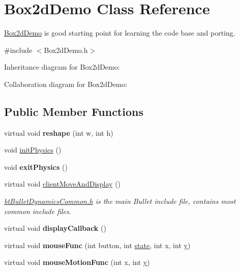 \hypertarget{class_box2d_demo}{\section{Box2d\+Demo Class Reference}
\label{class_box2d_demo}
}


\hyperlink{class_box2d_demo}{Box2d\+Demo} is good starting point for learning the code base and porting.  




{\ttfamily \#include $<$Box2d\+Demo.\+h$>$}



Inheritance diagram for Box2d\+Demo\+:


Collaboration diagram for Box2d\+Demo\+:
\subsection*{Public Member Functions}
\begin{DoxyCompactItemize}
\item 
\hypertarget{class_box2d_demo_afa4baf5e6b4451564c2dc715346d5800}{virtual void {\bfseries reshape} (int w, int h)}\label{class_box2d_demo_afa4baf5e6b4451564c2dc715346d5800}

\item 
void \hyperlink{class_box2d_demo_a424d04d7613f69ee06550fee98341ab8}{init\+Physics} ()
\item 
\hypertarget{class_box2d_demo_a20c44c1313f4e18649c2790307f689d6}{void {\bfseries exit\+Physics} ()}\label{class_box2d_demo_a20c44c1313f4e18649c2790307f689d6}

\item 
virtual void \hyperlink{class_box2d_demo_a138f47a65b5cc193011e4060ba4e6257}{client\+Move\+And\+Display} ()
\begin{DoxyCompactList}\small\item\em \hyperlink{bt_bullet_dynamics_common_8h_source}{bt\+Bullet\+Dynamics\+Common.\+h} is the main Bullet include file, contains most common include files. \end{DoxyCompactList}\item 
\hypertarget{class_box2d_demo_a5de8f1df336c6f63237256979f3a97b4}{virtual void {\bfseries display\+Callback} ()}\label{class_box2d_demo_a5de8f1df336c6f63237256979f3a97b4}

\item 
\hypertarget{class_box2d_demo_afe71daecdbad58767686a2364a7c4ec5}{virtual void {\bfseries mouse\+Func} (int button, int \hyperlink{structstate}{state}, int x, int \hyperlink{_ice_utils_8h_aa7ffaed69623192258fb8679569ff9ba}{y})}\label{class_box2d_demo_afe71daecdbad58767686a2364a7c4ec5}

\item 
\hypertarget{class_box2d_demo_a5d443e34a660bf7dd7e70cee9bdc9477}{virtual void {\bfseries mouse\+Motion\+Func} (int x, int \hyperlink{_ice_utils_8h_aa7ffaed69623192258fb8679569ff9ba}{y})}\label{class_box2d_demo_a5d443e34a660bf7dd7e70cee9bdc9477}

\end{DoxyCompactItemize}
